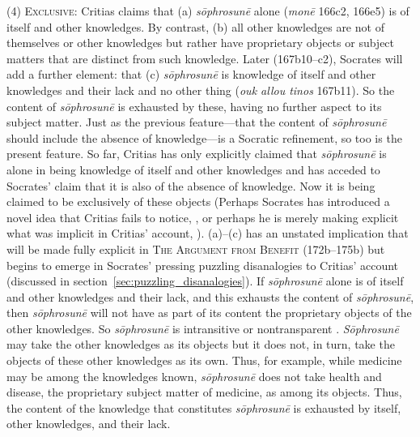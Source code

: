 (4) \textsc{Exclusive}: Critias claims that (a) \emph{sōphrosunē} alone (\emph{monē} 166c2, 166e5) is of itself and other knowledges. By contrast, (b) all other knowledges are not of themselves or other knowledges but rather have proprietary objects or subject matters that are distinct from such knowledge. Later (167b10–c2), Socrates will add a further element: that (c) \emph{sōphrosunē} is knowledge of itself and other knowledges and their lack and no other thing (\emph{ouk allou tinos} 167b11). So the content of \emph{sōphrosunē} is exhausted by these, having no further aspect to its subject matter. Just as the previous feature—that the content of \emph{sōphrosunē} should include the absence of knowledge—is a Socratic refinement, so too is the present feature. So far, Critias has only explicitly claimed that \emph{sōphrosunē} is alone in being knowledge of itself and other knowledges and has acceded to Socrates' claim that it is also of the absence of knowledge. Now it is being claimed to be exclusively of these objects (Perhaps Socrates has introduced a novel idea that Critias fails to notice, \citealt[37–8]{Duncombe:2020gi}, or perhaps he is merely making explicit what was implicit in Critias' account, \citealt[]{Tsouna:2022aa}). (a)–(c) has an unstated implication that will be made fully explicit in \textsc{The Argument from Benefit} (172b–175b) but begins to emerge in Socrates' pressing puzzling disanalogies to Critias' account (discussed in section~\ref{sec:puzzling_disanalogies}). If \emph{sōphrosunē} alone is of itself and other knowledges and their lack, and this exhausts the content of \emph{sōphrosunē}, then \emph{sōphrosunē} will not have as part of its content the proprietary objects of the other knowledges. So \emph{sōphrosunē} is intransitive \citep{McCabe:2007ss} or nontransparent \citep[190]{Tsouna:2022aa}. \emph{Sōphrosunē} may take the other knowledges as its objects but it does not, in turn, take the objects of these other knowledges as its own. Thus, for example, while medicine may be among the knowledges known, \emph{sōphrosunē} does not take health and disease, the proprietary subject matter of medicine, as among its objects. Thus, the content of the knowledge that constitutes \emph{sōphrosunē} is exhausted by itself, other knowledges, and their lack.

